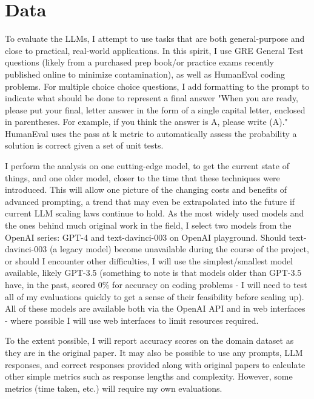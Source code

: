 \documentclass[11pt]{article}
\begin{document}
\section*{Data}

To evaluate the LLMs, I attempt to use tasks that are both general-purpose and close to practical, real-world applications. In this spirit, I use GRE General Test questions (likely from a purchased prep book/or practice exams recently published online to minimize contamination), as well as HumanEval coding problems. For multiple choice choice questions, I add formatting to the prompt to indicate what should be done to represent a final answer "When you are ready, please put your final, letter answer in the form of a single capital letter, enclosed in parentheses. For example, if you think the answer is A, please write (A)." HumanEval uses the pass at k metric to automatically assess the probability a solution is correct given a set of unit tests. \cite{chen_evaluating_2021}

I perform the analysis on one cutting-edge model, to get the current state of things, and one older model, closer to the time that these techniques were introduced. This will allow one picture of the changing costs and benefits of advanced prompting, a trend that may even be extrapolated into the future if current LLM scaling laws continue to hold. As the most widely used models and the ones behind much original work in the field, I select two models from the OpenAI series: GPT-4 and text-davinci-003 on OpenAI playground. Should text-davinci-003 (a legacy model) become unavailable during the course of the project, or should I encounter other difficulties, I will use the simplest/smallest model available, likely GPT-3.5 (something to note is that models older than GPT-3.5 have, in the past, scored 0\% for accuracy on coding problems - I will need to test all of my evaluations quickly to get a sense of their feasibility before scaling up). All of these models are available both via the OpenAI API and in web interfaces - where possible I will use web interfaces to limit resources required.

To the extent possible, I will report accuracy scores on the domain dataset as they are in the original paper. It may also be possible to use any prompts, LLM responses, and correct responses provided along with original papers to calculate other simple metrics such as response lengths and complexity. However, some metrics (time taken, etc.) will require my own evaluations.
\end{document}
